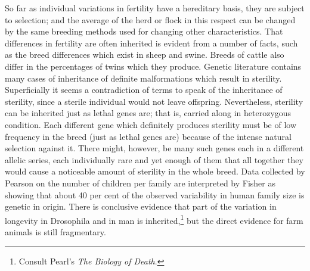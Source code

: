 So far as individual variations in fertility have a hereditary basis,
they are subject to selection; and the average of the herd or flock in this
respect can be changed by the same breeding methods used for changing
other characteristics. That differences in fertility are often inherited
is evident from a number of facts, such as the breed differences which
exist in sheep and swine. Breeds of cattle also differ in the percentages
of twins which they produce. Genetic literature contains many cases of
inheritance of definite malformations which result in sterility. Superficially
it seems a contradiction of terms to speak of the inheritance of
sterility, since a sterile individual would not leave offspring. Nevertheless,
sterility can be inherited just as lethal genes are; that is, carried
along in heterozygous condition. Each different gene which definitely
produces sterility must be of low frequency in the breed (just as lethal
genes are) because of the intense natural selection against it. There
might, however, be many such genes each in a different allelic series,
each individually rare and yet enough of them that all together they
would cause a noticeable amount of sterility in the whole breed. Data
collected by Pearson on the number of children per family are interpreted
by Fisher as showing that about 40 per cent of the observed variability
in human family size is genetic in origin. There is conclusive
evidence that part of the variation in longevity in Drosophila and in
man is inherited,\footnote{Consult Pearl's \textit{The Biology of Death}.}
but the direct evidence for farm animals is still
fragmentary.

